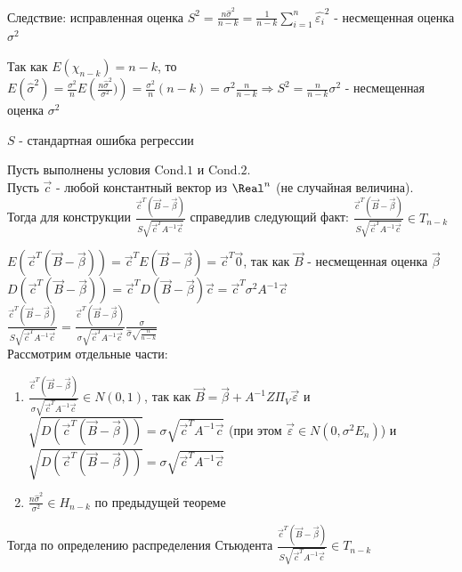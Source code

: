 Следствие: исправленная оценка $S^2 = \frac{n \hat{\sigma}^2}{n - k} = \frac{1}{n - k} \sum_{i = 1}^{n}\hat{\varepsilon_i}^2$ - несмещенная оценка $\sigma^2$

\begin{MyProof}
    Так как $E(\chi_{n - k}) = n - k$, то $E(\hat{\sigma}^2) = \frac{\sigma^2}{n} E\left(\frac{n \hat{\sigma}^2}{\sigma^2})\right) = \frac{\sigma^2}{n}(n - k) = \sigma^2 \frac{n}{n - k} \Rightarrow S^2 = \frac{n}{n - k} \sigma^2$ - несмещенная оценка $\sigma^2$
\end{MyProof}

\Def $S$ - стандартная ошибка регрессии

\begin{MyTheorem}
    \Ths Пусть выполнены условия $\mathrm{Cond. 1}$ и $\mathrm{Cond. 2}$.  \hfill \TagYTwoEight \\
    Пусть $\vec c$ - любой константный вектор из $\Real^n$ (не случайная величина). \\
    Тогда для конструкции $\frac{\vec{c}^T(\vec B - \vec \beta)}{S\sqrt{\vec{c}^T A^{-1} \vec c}}$ справедлив следующий факт: $\frac{\vec{c}^T(\vec B - \vec \beta)}{S\sqrt{\vec{c}^T A^{-1} \vec c}} \in T_{n - k}$
\end{MyTheorem}

\begin{MyProof}
    $E(\vec{c}^T(\vec B - \vec \beta)) = \vec{c}^T E(\vec B - \vec \beta) = \vec{c}^T \vec 0$, так как $\vec B$ - несмещенная оценка $\vec \beta$ \\
    $D(\vec{c}^T(\vec B - \vec \beta)) = \vec{c}^T D(\vec B - \vec \beta) \vec c = \vec{c}^T \sigma^2 A^{-1} \vec c$ \\
    $\frac{\vec{c}^T(\vec B - \vec \beta)}{S\sqrt{\vec{c}^T A^{-1} \vec c}} = \frac{\vec{c}^T(\vec B - \vec \beta)}{\sigma\sqrt{\vec{c}^T A^{-1} \vec c}} \frac{\sigma}{\hat{\sigma} \sqrt{\frac{n}{n - k}}}$ \\
    Рассмотрим отдельные части:
    \begin{enumerate}
        \item $\frac{\vec{c}^T(\vec B - \vec \beta)}{\sigma\sqrt{\vec{c}^T A^{-1} \vec c}} \in N(0, 1)$, так как $\vec B = \vec \beta + A^{-1} Z \Pi_V \vec \varepsilon$ и $\sqrt{D(\vec{c}^T(\vec B - \vec \beta))} = \sigma \sqrt{\vec{c}^T A^{-1} \vec c}$ (при этом $\vec \varepsilon \in N(0, \sigma^2 E_n)$) и $\sqrt{D(\vec{c}^T(\vec B - \vec \beta))} = \sigma \sqrt{\vec{c}^T A^{-1} \vec c}$
        \item $\frac{n \hat{\sigma}^2}{\sigma^2} \in H_{n - k}$ по предыдущей теореме
    \end{enumerate}

    Тогда по определению распределения Стьюдента $\frac{\vec{c}^T(\vec B - \vec \beta)}{S\sqrt{\vec{c}^T A^{-1} \vec c}} \in T_{n - k}$
\end{MyProof}

